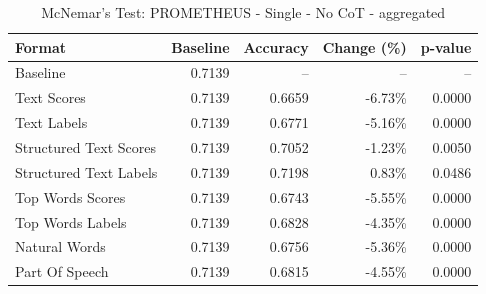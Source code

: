 \begin{table}[htbp]
\centering
\caption{McNemar's Test: PROMETHEUS - Single - No CoT - aggregated}
\label{tab:prometheus-single-no_chain_of_thought-aggregated}
\begin{tabular}{lrrrr}
\toprule
Format & Baseline & Accuracy & Change (\%) & p-value \\
\midrule
Baseline & 0.7139 & -- & -- & -- \\
Text Scores & 0.7139 & 0.6659 & -6.73\% & 0.0000 \\
Text Labels & 0.7139 & 0.6771 & -5.16\% & 0.0000 \\
Structured Text Scores & 0.7139 & 0.7052 & -1.23\% & 0.0050 \\
Structured Text Labels & 0.7139 & 0.7198 & 0.83\% & 0.0486 \\
Top Words Scores & 0.7139 & 0.6743 & -5.55\% & 0.0000 \\
Top Words Labels & 0.7139 & 0.6828 & -4.35\% & 0.0000 \\
Natural Words & 0.7139 & 0.6756 & -5.36\% & 0.0000 \\
Part Of Speech & 0.7139 & 0.6815 & -4.55\% & 0.0000 \\
\bottomrule
\end{tabular}
\end{table}
